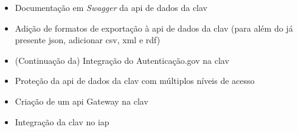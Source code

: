 \begin{itemize}
    \item Documentação em \textit{Swagger} da \acrshort{api} de dados da \acrshort{clav}
    \item Adição de formatos de exportação à \acrshort{api} de dados da \acrshort{clav} (para além do já presente \acrshort{json}, adicionar \acrshort{csv}, \acrshort{xml} e \acrshort{rdf})
    \item (Continuação da) Integração do Autenticação.gov na \acrshort{clav}
    \item Proteção da \acrshort{api} de dados da \acrshort{clav} com múltiplos níveis de acesso
    \item Criação de um \acrshort{api} Gateway na \acrshort{clav}
    \item Integração da \acrshort{clav} no \acrshort{iap}
\end{itemize}

